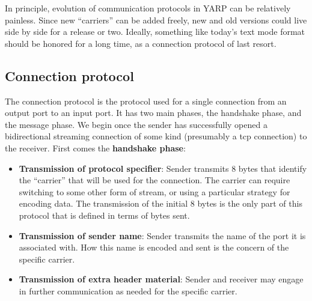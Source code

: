 

In principle, evolution of communication protocols in YARP can be
relatively painless.  Since new ``carriers'' can be added freely,
new and old versions could live side by side
for a release or two.  Ideally,
something like today's text mode format should be honored for a long
time, as a connection protocol of last resort.


\ifverbose

\subsection{Connection protocol}

The connection protocol 
is the protocol used for a single connection from an output port
to an input port. It has two main phases, the handshake phase,
and the message phase.
%
We begin once the sender has successfully opened a bidirectional
streaming connection of some kind (presumably a tcp
connection) to the receiver.
First comes the {\bf handshake phase}:

\begin{itemize} \pflist

\item {\bf Transmission of protocol specifier}:
Sender transmits 8 bytes that identify the ``carrier'' that will be
used for the connection.  The carrier can require switching to 
some other form of stream, or using a particular strategy for
encoding data.  The transmission of the initial 8 bytes is the
only part of this protocol that is defined in terms of bytes sent.

\item {\bf Transmission of sender name}: Sender transmits the name of
the port it is associated with.  How this name is encoded and sent is
the concern of the specific carrier.

\item {\bf Transmission of extra header material}: Sender and
receiver may engage in further communication as needed for the
specific carrier.  

\end{itemize}

